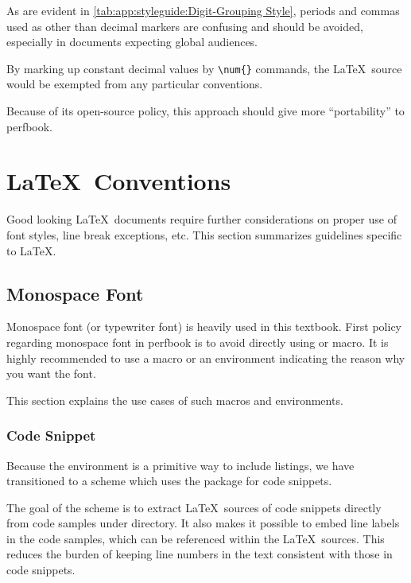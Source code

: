As are evident in
\cref{tab:app:styleguide:Digit-Grouping Style},
periods and commas used as other than decimal markers are confusing
and should be avoided, especially in documents expecting global
audiences.

By marking up constant decimal values by \verb|\num{}| commands,
the \LaTeX\ source would be exempted from any particular conventions.

Because of its open-source policy, this approach should give
more ``portability'' to perfbook.

\section{\LaTeX\ Conventions}
\label{sec:app:styleguide:LaTeX Conventions}

Good looking \LaTeX\ documents require further considerations
on proper use of font styles, line break exceptions, etc.
This section summarizes guidelines specific to \LaTeX.

\subsection{Monospace Font}
\label{sec:app:styleguide:Monospace Font}

Monospace font (or typewriter font) is heavily used in this textbook.
First policy regarding monospace font in perfbook is to avoid
directly using \qco{\\texttt} or \qco{\\tt} macro.
It is highly recommended to use a macro or an environment
indicating the reason why you want the font.

This section explains the use cases of such macros and environments.

\subsubsection{Code Snippet}
\label{sec:app:styleguide:Code Snippet}

Because the  environment is a primitive way to include
listings, we have transitioned to a scheme which uses
the  package for code snippets.

The goal of the scheme is to extract \LaTeX\ sources of
code snippets directly from code samples under 
directory.
It also makes it possible to embed line labels in the code samples,
which can be referenced within the \LaTeX\ sources.
This reduces the burden of keeping line numbers
in the text consistent with those in code snippets.

